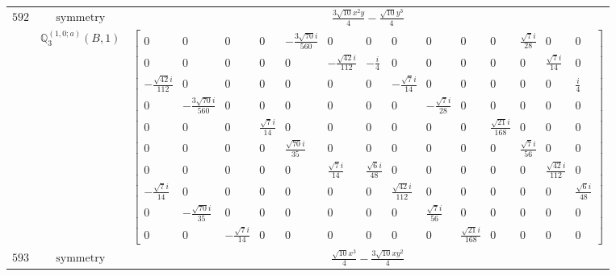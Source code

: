 \documentclass[fleqn,8pt,landscape]{jsarticle}
\begin{document}
\begin{longtable}{ccc}
$ 592 $ & $ \text{symmetry} $ & $ \frac{3 \sqrt{10} x^{2} y}{4} - \frac{\sqrt{10} y^{3}}{4} $ \\
$  $ & $ \mathbb{Q}_{3}^{(1,0;a)}(B,1) $ & $ \begin{bmatrix} 0 & 0 & 0 & 0 & - \frac{3 \sqrt{70} i}{560} & 0 & 0 & 0 & 0 & 0 & 0 & \frac{\sqrt{7} i}{28} & 0 & 0 \\ 0 & 0 & 0 & 0 & 0 & - \frac{\sqrt{42} i}{112} & - \frac{i}{4} & 0 & 0 & 0 & 0 & 0 & \frac{\sqrt{7} i}{14} & 0 \\ - \frac{\sqrt{42} i}{112} & 0 & 0 & 0 & 0 & 0 & 0 & - \frac{\sqrt{7} i}{14} & 0 & 0 & 0 & 0 & 0 & \frac{i}{4} \\ 0 & - \frac{3 \sqrt{70} i}{560} & 0 & 0 & 0 & 0 & 0 & 0 & - \frac{\sqrt{7} i}{28} & 0 & 0 & 0 & 0 & 0 \\ 0 & 0 & 0 & \frac{\sqrt{7} i}{14} & 0 & 0 & 0 & 0 & 0 & 0 & \frac{\sqrt{21} i}{168} & 0 & 0 & 0 \\ 0 & 0 & 0 & 0 & \frac{\sqrt{70} i}{35} & 0 & 0 & 0 & 0 & 0 & 0 & \frac{\sqrt{7} i}{56} & 0 & 0 \\ 0 & 0 & 0 & 0 & 0 & \frac{\sqrt{7} i}{14} & \frac{\sqrt{6} i}{48} & 0 & 0 & 0 & 0 & 0 & \frac{\sqrt{42} i}{112} & 0 \\ - \frac{\sqrt{7} i}{14} & 0 & 0 & 0 & 0 & 0 & 0 & \frac{\sqrt{42} i}{112} & 0 & 0 & 0 & 0 & 0 & \frac{\sqrt{6} i}{48} \\ 0 & - \frac{\sqrt{70} i}{35} & 0 & 0 & 0 & 0 & 0 & 0 & \frac{\sqrt{7} i}{56} & 0 & 0 & 0 & 0 & 0 \\ 0 & 0 & - \frac{\sqrt{7} i}{14} & 0 & 0 & 0 & 0 & 0 & 0 & \frac{\sqrt{21} i}{168} & 0 & 0 & 0 & 0 \end{bmatrix} $ \\ \hline
$ 593 $ & $ \text{symmetry} $ & $ \frac{\sqrt{10} x^{3}}{4} - \frac{3 \sqrt{10} x y^{2}}{4} $ \\

\end{longtable}
\end{document}
